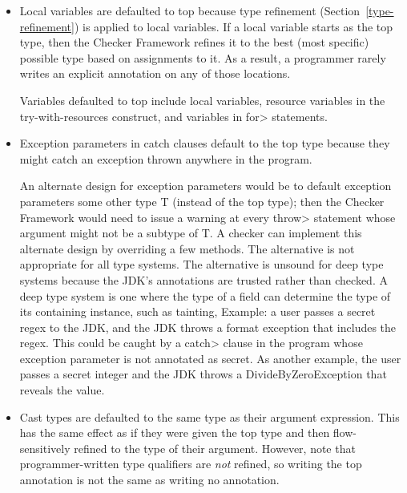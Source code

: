 \begin{itemize}
\item
Local variables are defaulted to top because type refinement
(Section~\ref{type-refinement}) is applied to local variables.  If a local
variable starts as the top type, then the Checker Framework refines it to
the best (most specific) possible type based on assignments to it.  As a
result, a programmer rarely writes an explicit annotation on any of those
locations.

Variables defaulted to top include local variables, resource variables in the
try-with-resources construct, and variables in \<for> statements.

\item
Exception parameters in catch clauses default to the top type because they
might catch an exception thrown anywhere in the program.

An alternate design for exception parameters would be to default exception
parameters some other type T (instead of the top type); then the Checker
Framework would need to issue a warning at every \<throw> statement whose
argument might not be a subtype of T\@.  A checker can implement this
alternate design by overriding a few methods.  The alternative is not
appropriate for all type systems.  The alternative is unsound for deep type
systems because the JDK's annotations are trusted rather than checked.  A
deep type system is one where the type of a field can determine the type of
its containing instance, such as tainting, Example: a user passes a secret
regex to the JDK, and the JDK throws a format exception that includes the
regex.  This could be caught by a \<catch> clause in the program whose
exception parameter is not annotated as secret.  As another example, the
user passes a secret integer and the JDK throws a DivideByZeroException
that reveals the value.


\item
Cast types are defaulted to the same type as their argument expression.
This has the same effect as if they were given the
top type and then flow-sensitively refined to the type of their argument.
However, note that programmer-written type qualifiers are \emph{not}
refined, so writing the top annotation is not the same as writing no annotation.


\end{itemize}
